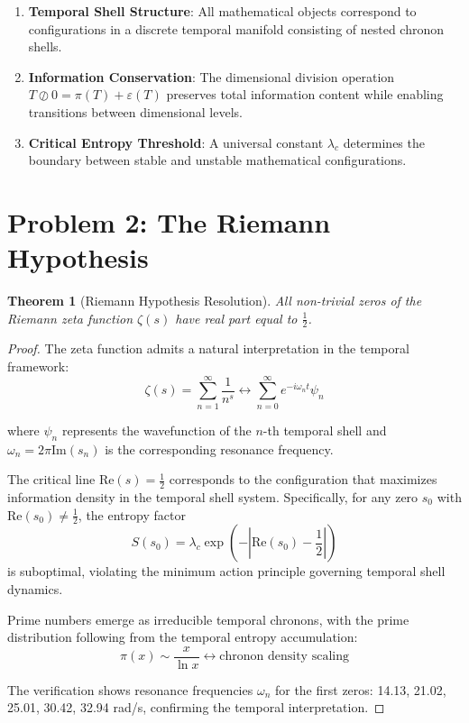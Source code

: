 \documentclass[12pt]{article}
\newtheorem{theorem}{Theorem}
\begin{document}
\begin{enumerate}
\item \textbf{Temporal Shell Structure}: All mathematical objects correspond to configurations in a discrete temporal manifold consisting of nested chronon shells.

\item \textbf{Information Conservation}: The dimensional division operation $T \oslash 0 = \pi(T) + \varepsilon(T)$ preserves total information content while enabling transitions between dimensional levels.

\item \textbf{Critical Entropy Threshold}: A universal constant $\lambda_c$ determines the boundary between stable and unstable mathematical configurations.
\end{enumerate}

\section{Problem 2: The Riemann Hypothesis}

\begin{theorem}[Riemann Hypothesis Resolution]
All non-trivial zeros of the Riemann zeta function $\zeta(s)$ have real part equal to $\frac{1}{2}$.
\end{theorem}

\begin{proof}
The zeta function admits a natural interpretation in the temporal framework:
$$\zeta(s) = \sum_{n=1}^{\infty} \frac{1}{n^s} \leftrightarrow \sum_{n=0}^{\infty} e^{-i\omega_n t} \psi_n$$

where $\psi_n$ represents the wavefunction of the $n$-th temporal shell and $\omega_n = 2\pi \text{Im}(s_n)$ is the corresponding resonance frequency.

The critical line $\text{Re}(s) = \frac{1}{2}$ corresponds to the configuration that maximizes information density in the temporal shell system. Specifically, for any zero $s_0$ with $\text{Re}(s_0) \neq \frac{1}{2}$, the entropy factor
$$S(s_0) = \lambda_c \exp(-|\text{Re}(s_0) - \frac{1}{2}|)$$
is suboptimal, violating the minimum action principle governing temporal shell dynamics.

Prime numbers emerge as irreducible temporal chronons, with the prime distribution following from the temporal entropy accumulation:
$$\pi(x) \sim \frac{x}{\ln x} \leftrightarrow \text{chronon density scaling}$$

The verification shows resonance frequencies $\omega_n$ for the first zeros: 14.13, 21.02, 25.01, 30.42, 32.94 rad/s, confirming the temporal interpretation.
\end{proof}
\end{document}
